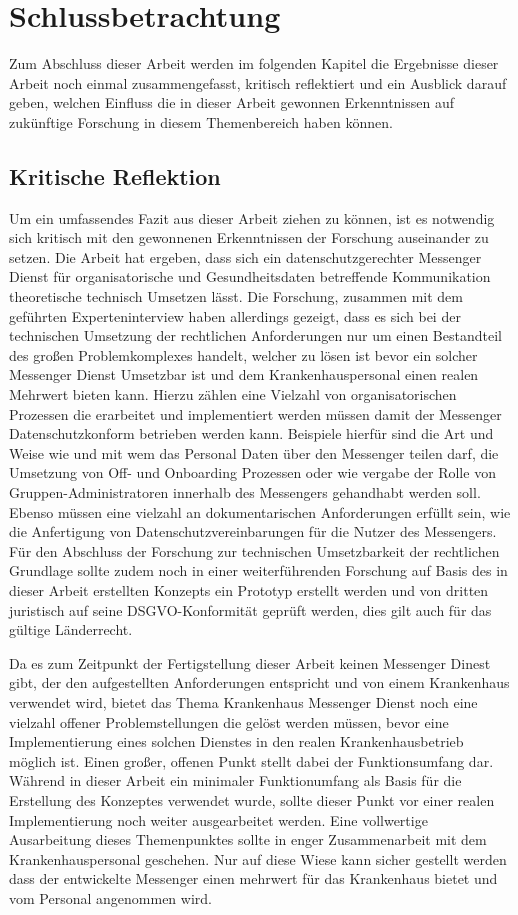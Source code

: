 \chapter{Schlussbetrachtung}\label{chapter:schlussbetrachtung}
Zum Abschluss dieser Arbeit werden im folgenden Kapitel die Ergebnisse dieser Arbeit noch einmal zusammengefasst, kritisch reflektiert und ein Ausblick darauf geben, welchen Einfluss die in dieser Arbeit gewonnen Erkenntnissen auf zukünftige Forschung in diesem Themenbereich haben können.

\section{Kritische Reflektion}\label{chapter:kr}
Um ein umfassendes Fazit aus dieser Arbeit ziehen zu können, ist es notwendig sich kritisch mit den gewonnenen Erkenntnissen der Forschung auseinander zu setzen. Die Arbeit hat ergeben, dass sich ein datenschutzgerechter Messenger Dienst für organisatorische und Gesundheitsdaten betreffende Kommunikation theoretische technisch Umsetzen lässt. Die Forschung, zusammen mit dem geführten Experteninterview haben allerdings gezeigt, dass es sich bei der technischen Umsetzung der rechtlichen Anforderungen nur um einen Bestandteil des großen Problemkomplexes handelt, welcher zu lösen ist bevor ein solcher Messenger Dienst Umsetzbar ist und dem Krankenhauspersonal einen realen Mehrwert bieten kann.  Hierzu zählen eine Vielzahl von organisatorischen Prozessen die erarbeitet und implementiert werden müssen damit der Messenger Datenschutzkonform betrieben werden kann. Beispiele hierfür sind die Art und Weise wie und mit wem das Personal Daten über den Messenger teilen darf, die Umsetzung von Off- und Onboarding Prozessen oder wie vergabe der Rolle von Gruppen-Administratoren innerhalb des Messengers gehandhabt werden soll. Ebenso müssen eine vielzahl an dokumentarischen Anforderungen erfüllt sein, wie die Anfertigung von Datenschutzvereinbarungen für die Nutzer des Messengers.
Für den Abschluss der Forschung zur technischen Umsetzbarkeit der rechtlichen Grundlage sollte zudem noch in einer weiterführenden Forschung auf Basis des in dieser Arbeit erstellten Konzepts ein Prototyp erstellt werden und von dritten juristisch auf seine DSGVO-Konformität geprüft werden, dies gilt auch für das gültige Länderrecht.

Da es zum Zeitpunkt der Fertigstellung dieser Arbeit keinen Messenger Dinest gibt, der den aufgestellten Anforderungen entspricht und von einem Krankenhaus verwendet wird, bietet das Thema Krankenhaus Messenger Dienst noch eine vielzahl offener Problemstellungen die gelöst werden müssen, bevor eine Implementierung eines solchen Dienstes in den realen Krankenhausbetrieb möglich ist.
Einen großer, offenen Punkt stellt dabei der Funktionsumfang dar. Während in dieser Arbeit ein minimaler Funktionumfang als Basis für die Erstellung des Konzeptes verwendet wurde, sollte dieser Punkt vor einer realen Implementierung noch weiter ausgearbeitet werden. Eine vollwertige Ausarbeitung dieses Themenpunktes sollte in enger Zusammenarbeit mit dem Krankenhauspersonal geschehen. Nur auf diese Wiese kann sicher gestellt werden dass der entwickelte Messenger einen mehrwert für das Krankenhaus bietet und vom Personal angenommen wird.

